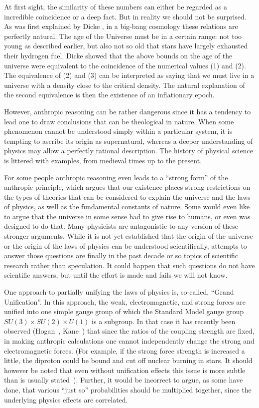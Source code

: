 \documentclass{article}
\begin{document}
At first sight, the similarity of these numbers can either be regarded
as a incredible coincidence or a deep fact. But in reality we should
not be surprised. As was first explained by Dicke \cite{RHD:ln},
in a big-bang cosmology these relations are perfectly natural. The age of
the Universe must be in a certain range: not too young as described
earlier,
but also not so old that
stars have largely exhausted their hydrogen fuel.
Dicke showed that the above bounds on the age of the universe were
equivalent to the coincidence of the numerical values  (1)
and (2). The equivalence of (2) and (3) can be interpreted as saying that
we must live in a universe  with a density close to the critical
density. The natural explanation of the second equivalence  is then
the existence of an inflationary epoch.

However, anthropic reasoning can be rather dangerous since it has
a tendency to lead one to draw conclusions that can be theological in
nature. When some phenomenon cannot be understood simply within
a particular system, it is tempting to ascribe its origin as
supernatural, whereas a deeper understanding of physics may allow
a perfectly rational description. The history of physical
science is littered with examples, from medieval times  up to the present.

For some people anthropic reasoning even leads to a ``strong form'' of
the anthropic principle, which argues that our existence places strong
restrictions on the types of theories that can be considered to explain
the universe and the laws of physics, as well as the fundamental
constants of nature. Some would even like to argue that the universe in
some sense had to give rise to humans, or even was designed to do
that. Many physicists are antagonistic to any version of these stronger
arguments. While it is not yet established that the origin of the
universe or the origin of the laws of physics can be understood
scientifically, attempts to answer those questions are finally in the
past decade or so topics of scientific research rather than
speculation. It could happen that such questions do not have scientific
answers, but until the effort is made and fails we will not know.

One approach to partially unifying the laws of physics is, so-called,
``Grand Unification''. In this approach, the weak, electromagnetic,
and strong forces are unified into one simple gauge group of which
the Standard Model gauge group $SU(3)\times SU(2)\times U(1)$ is a subgroup.
In that case it has recently been observed (Hogan~\cite{CH:justso},
Kane~\cite{GLK:what}) that since the
ratios of the coupling strength are fixed,  in making anthropic
calculations one cannot independently change the strong and
electromagnetic forces. (For example, if the strong force strength is
increased a little, the diproton could be bound and cut off nuclear
burning in stars. It should however be noted that even without unification
effects this issue is
more subtle than is usually stated~\cite{AL:book}).
Further, it would be incorrect to argue, as some have done, that
various ``just so'' probabilities should be multiplied together,
since the underlying physics effects are correlated.
\end{document}
